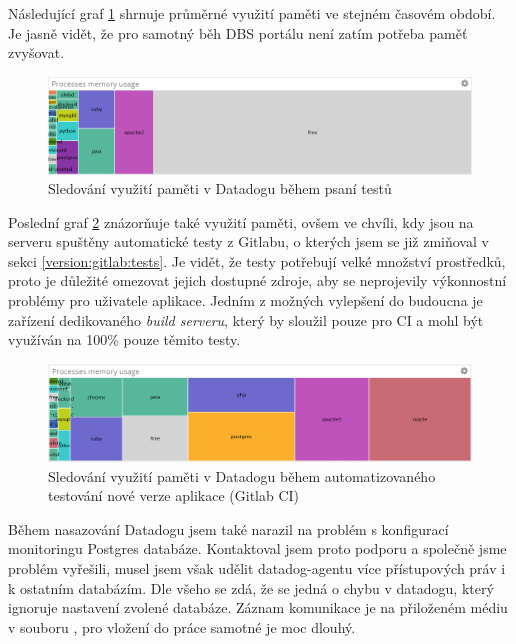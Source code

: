 Následující graf \ref{picture:datadog-memory-normal} shrnuje průměrné využití paměti ve stejném časovém období. Je jasně vidět, že pro samotný běh DBS portálu není zatím potřeba paměť zvyšovat.\\
\begin{figure}[H]
\includegraphics[width=\textwidth]{../png/datadog-memory-normal.png}
\caption{Sledování využití paměti v Datadogu během psaní testů} \label{picture:datadog-memory-normal}
\end{figure}
Poslední graf \ref{picture:datadog-memory-tests} znázorňuje také využití paměti, ovšem ve chvíli, kdy jsou na serveru spuštěny automatické testy z Gitlabu, o kterých jsem se již zmiňoval v sekci \ref{version:gitlab:tests}. Je vidět, že testy potřebují velké množství prostředků, proto je důležité omezovat jejich dostupné zdroje, aby se neprojevily výkonnostní problémy pro uživatele aplikace. Jedním z možných vylepšení do budoucna je zařízení dedikovaného \emph{build serveru}, který by sloužil pouze pro CI a mohl být využíván na 100\% pouze těmito testy.
\begin{figure}[H]
\includegraphics[width=\textwidth]{../png/datadog-memory-tests.png}
\caption{Sledování využití paměti v Datadogu během automatizovaného testování nové verze aplikace (Gitlab CI)} \label{picture:datadog-memory-tests}
\end{figure}

Během nasazování Datadogu jsem také narazil na problém s konfigurací monitoringu Postgres databáze. Kontaktoval jsem proto podporu a společně jsme problém vyřešili, musel jsem však udělit datadog-agentu více přístupových práv i k ostatním databázím. Dle všeho se zdá, že se jedná o chybu v datadogu, který ignoruje nastavení zvolené databáze. Záznam komunikace je na přiloženém médiu v souboru , pro vložení do práce samotné je moc dlouhý.

